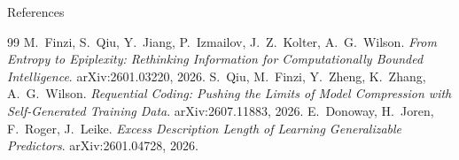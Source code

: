 \documentclass[aspectratio=43]{beamer}
\begin{document}
\begin{frame}[t]{References}
\small
\begin{thebibliography}{99}
M.~Finzi, S.~Qiu, Y.~Jiang, P.~Izmailov, J.~Z.~Kolter, A.~G.~Wilson.
\newblock \emph{From Entropy to Epiplexity: Rethinking Information for Computationally Bounded Intelligence}.
\newblock arXiv:2601.03220, 2026.
S.~Qiu, M.~Finzi, Y.~Zheng, K.~Zhang, A.~G.~Wilson.
\newblock \emph{Requential Coding: Pushing the Limits of Model Compression with Self-Generated Training Data}.
\newblock arXiv:2607.11883, 2026.
E.~Donoway, H.~Joren, F.~Roger, J.~Leike.
\newblock \emph{Excess Description Length of Learning Generalizable Predictors}.
\newblock arXiv:2601.04728, 2026.
\end{thebibliography}
\end{frame}
\end{document}
